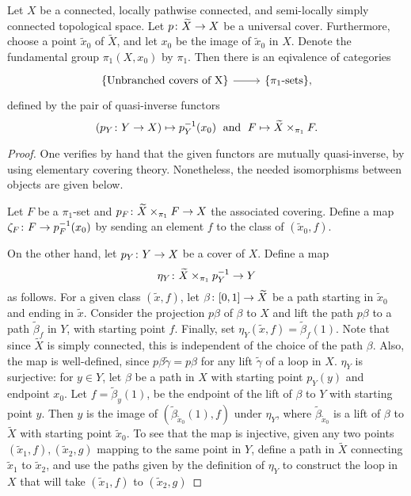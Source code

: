 \begin{prop}

 Let $X$ be a connected, locally pathwise connected, and semi-locally simply connected topological space. Let $p\colon\widetilde{X}\to X$ be a universal cover. Furthermore, choose a point $\widetilde{x}_0$ of $\widetilde{X}$, and let $x_0$ be the image of $\widetilde{x}_0$ in $X$. Denote the fundamental group $\pi_1(X,x_0)$ by $\pi_1$. Then there is an eqivalence of categories
 \[
 \begin{tikzcd}
  \{\text{Unbranched covers of X}\} \arrow{r} & \{\pi_1\text{-sets}\},
 \end{tikzcd}
 \]
 defined by the pair of quasi-inverse functors \[(p_Y\colon Y\to X) \mapsto p^{-1}_Y(x_0)\;\text{ and }\;F \mapsto \widetilde{X} \times_{\pi_1} F.\]
\end{prop}
\begin{proof}
 One verifies by hand that the given functors are mutually quasi-inverse, by using elementary covering theory. Nonetheless, the needed isomorphisms between objects are given below.
 
 Let $F$ be a $\pi_1$-set and $p_F\colon \widetilde{X} \times_{\pi_1} F \to X$ the associated covering. Define a map $\zeta_F\colon F\to p_F^{-1}(x_0)$ by sending an element $f$ to the class of $(\widetilde{x}_0,f)$.
 
 On the other hand, let $p_Y\colon Y\to X$ be a cover of $X$. Define a map \[\eta_Y\colon \widetilde{X}\times_{\pi_1} p_Y^{-1} \to Y\] as follows. For a given class $(\widetilde{x},f)$, let $\beta\colon [0,1] \to \widetilde{X}$ be a path starting in $\widetilde{x}_0$ and ending in $\widetilde{x}$. Consider the projection $p\beta$ of $\beta$ to $X$ and lift the path $p\beta$ to a path $\widetilde{\beta}_f$ in $Y$, with starting point $f$. Finally, set $\eta_Y(\widetilde{x},f)=\widetilde{\beta}_f(1)$. Note that since $\widetilde{X}$ is simply connected, this is independent of the choice of the path $\beta$. Also, the map is well-defined, since $p\beta \widetilde{\gamma} = p\beta$ for any lift $\widetilde{\gamma}$ of a loop in $X$.
 $\eta_Y$ is surjective: for $y \in Y$, let $\beta$ be a path in $X$ with starting point $p_Y(y)$ and endpoint $x_0$. Let $f=\widetilde{\beta}_{y}(1)$, be the endpoint of the lift of $\beta$ to $Y$ with starting point $y$. Then $y$ is the image of $(\widetilde{\beta}_{\widetilde{x}_0}(1),f)$ under $\eta_Y$, where $\widetilde{\beta}_{\widetilde{x}_0}$ is a lift of $\beta$ to $\widetilde{X}$ with starting point $\widetilde{x}_0$. To see that the map is injective, given any two points $(\widetilde{x}_1,f),(\widetilde{x}_2,g)$ mapping to the same point in $Y$, define a path in $\widetilde{X}$ connecting $\widetilde{x}_1$ to $\widetilde{x}_2$, and use the paths given by the definition of $\eta_Y$ to construct the loop in $X$ that will take $(\widetilde{x}_1,f)$ to $(\widetilde{x}_2,g)$
 \fi
\end{proof}

